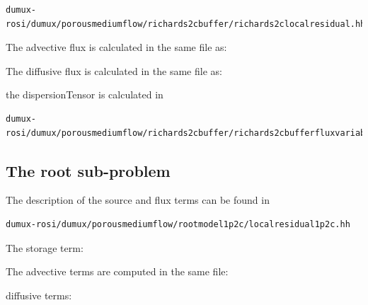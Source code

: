 \begin{lstlisting}
dumux-rosi/dumux/porousmediumflow/richards2cbuffer/richards2clocalresidual.hh
\end{lstlisting}


The advective flux is calculated in the same file as:


The diffusive flux is calculated in the same file as:



the dispersionTensor is calculated in

\begin{lstlisting}
dumux-rosi/dumux/porousmediumflow/richards2cbuffer/richards2cbufferfluxvariables.hh
\end{lstlisting}


\subsection*{The root sub-problem}

The description of the source and flux terms can be found in

\begin{lstlisting}
dumux-rosi/dumux/porousmediumflow/rootmodel1p2c/localresidual1p2c.hh
\end{lstlisting}
The storage term:


The advective terms are computed in the same file:


diffusive terms:


